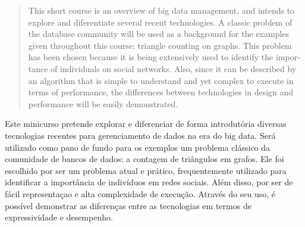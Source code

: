 \begin{abstract}
\begin{otherlanguage}{english}
This short course is an overview of big data management, and
intends to explore and diferentiate several recent technologies. A
classic problem of the database community will be used as a background for the 
examples given throughout this course: triangle counting on graphs. This 
problem has been chosen because it is being extensively used to identify 
the importance of individuals on social networks. 
Also, since it can be described by an algorithm that is simple to understand and 
yet complex to execute in terms of performance, the differences between technologies
in design and performance will be easily demonstrated. 
\end{otherlanguage}
\end{abstract}

\begin{resumo}
Este minicurso pretende explorar e diferenciar de forma introdutória diversas 
tecnologias recentes
para gerenciamento de dados na era do big data. Será utilizado como pano de fundo para os
exemplos um problema clássico da comunidade de bancos de dados: a contagem de triângulos
em grafos. Ele foi escolhido por ser um problema atual e prático, frequentemente 
utilizado para identificar a importância de indivíduos em redes sociais. Além disso, por ser de
fácil representaçao e alta complexidade de execução. Através do seu uso, é possível demonstrar
as diferenças entre as tecnologias em termos de expressividade e desempenho. 
\end{resumo}

